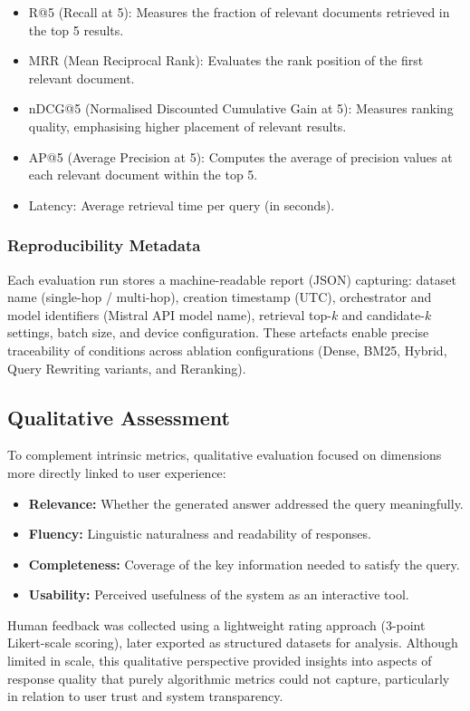 \begin{spacing}{1.5}
\begin{itemize}
    \item R@5 (Recall at 5): Measures the fraction of relevant documents retrieved in the top 5 results.
    \item MRR (Mean Reciprocal Rank): Evaluates the rank position of the first relevant document.
    \item nDCG@5 (Normalised Discounted Cumulative Gain at 5): Measures ranking quality, emphasising higher placement of relevant results.
    \item AP@5 (Average Precision at 5): Computes the average of precision values at each relevant document within the top 5.
    \item Latency: Average retrieval time per query (in seconds).
\end{itemize}

\subsubsection*{Reproducibility Metadata}

Each evaluation run stores a machine-readable report (JSON) capturing: dataset name (single-hop / multi-hop), creation timestamp (UTC), orchestrator and model identifiers (Mistral API model name), retrieval top-$k$ and candidate-$k$ settings, batch size, and device configuration. These artefacts enable precise traceability of conditions across ablation configurations (Dense, BM25, Hybrid, Query Rewriting variants, and Reranking).

\subsection{Qualitative Assessment}
To complement intrinsic metrics, qualitative evaluation focused on dimensions more directly linked to user experience:
\begin{itemize}
      \item \textbf{Relevance:} Whether the generated answer addressed the query meaningfully.
      \item \textbf{Fluency:} Linguistic naturalness and readability of responses.
      \item \textbf{Completeness:} Coverage of the key information needed to satisfy the query.
      \item \textbf{Usability:} Perceived usefulness of the system as an interactive tool.
\end{itemize}

Human feedback was collected using a lightweight rating approach (3-point Likert-scale scoring), later exported as structured datasets for analysis. Although limited in scale, this qualitative perspective provided insights into aspects of response quality that purely algorithmic metrics could not capture, particularly in relation to user trust and system transparency.




\end{spacing}
